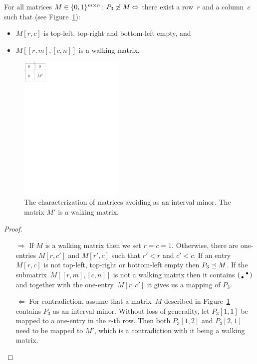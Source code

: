 \begin{prop}
\label{prop:p31}
For all matrices $M\in\{0,1\}^{m\times n}$: $P_3\not\preceq M\Leftrightarrow$ there exist a row~$r$ and a column~$c$ such that (see Figure~\ref{fig:p12}):
\begin{itemize}
\item $M[r,c]$ is top-left, top-right and bottom-left empty, and
\item $M[[r,m],[c,n]]$ is a walking matrix.
\end{itemize}
\end{prop}
\begin{figure}[!ht]
\centering
\includegraphics[width=50mm]{img/p12.pdf}
\caption{The characterization of matrices avoiding \usebox{\smlmat} as an interval minor. The matrix $M'$ is a walking matrix.}
\label{fig:p12}
\end{figure}
\begin{proof}
\begin{itemize}
	\item[$\Rightarrow$] If $M$ is a walking matrix then we set $r=c=1$. Otherwise, there are one-entries $M[r,c']$ and $M[r',c]$ such that $r'<r$ and $c'<c$. If an entry~$M[r,c]$ is not top-left, top-right or bottom-left empty then $P_3\preceq M$. If the submatrix~$M[[r,m],[c,n]]$ is not a walking matrix then it contains $\left(\begin{smallmatrix} &\bullet\\\bullet& \end{smallmatrix}\right)$ and together with the one-entry~$M[r,c']$ it gives us a mapping of $P_3$.
	\item[$\Leftarrow$] For contradiction, assume that a matrix~$M$ described in Figure~\ref{fig:p12} contains $P_3$ as an interval minor. Without loss of generality, let $P_3[1,1]$ be mapped to a one-entry in the $r$-th row. Then both $P_3[1,2]$ and $P_3[2,1]$ need to be mapped to $M'$, which is a contradiction with it being a walking matrix. \qedhere
\end{itemize}
\end{proof}

